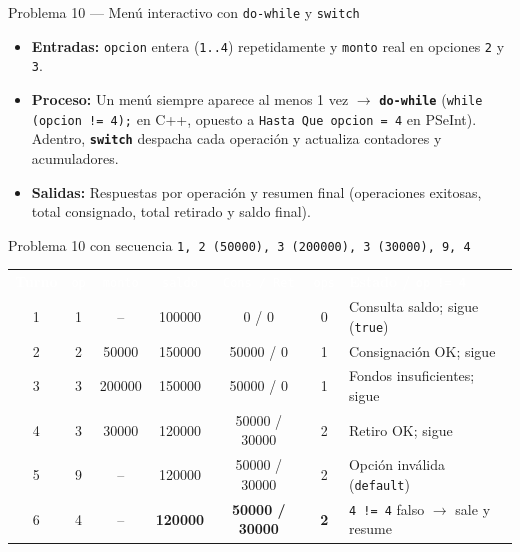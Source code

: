 \documentclass[11pt,letterpaper]{article}
\begin{document}
\begin{analisis}{Problema 10 --- Menú interactivo con \texttt{do-while} y \texttt{switch}}
\begin{itemize}
  \item \textbf{Entradas:} \texttt{opcion} entera (\texttt{1..4}) repetidamente y \texttt{monto} real en opciones \texttt{2} y \texttt{3}.
  \item \textbf{Proceso:} Un menú siempre aparece al menos 1 vez $\rightarrow$ \textbf{\texttt{do-while}} (\texttt{while (opcion != 4);} en C++, opuesto a \texttt{Hasta Que opcion = 4} en PSeInt). Adentro, \textbf{\texttt{switch}} despacha cada operación y actualiza contadores y acumuladores.
  \item \textbf{Salidas:} Respuestas por operación y resumen final (operaciones exitosas, total consignado, total retirado y saldo final).
\end{itemize}
\end{analisis}






\begin{pruebaescritorio}{Problema 10 con secuencia \texttt{1, 2 (50000), 3 (200000), 3 (30000), 9, 4}}
\begin{center}
\footnotesize
\setlength{\tabcolsep}{4pt}
\renewcommand{\arraystretch}{1.15}
\begin{tabularx}{\linewidth}{c c c c c c X}
\rowcolor{AzulMarino}
\textcolor{white}{\textbf{Turno}} & \textcolor{white}{\texttt{op}} & \textcolor{white}{\texttt{monto}} & \textcolor{white}{\texttt{saldo}} & \textcolor{white}{\texttt{Cons / Ret}} & \textcolor{white}{\texttt{ops}} & \textcolor{white}{\textbf{Estado / \texttt{op != 4}}} \\
1 & 1 & -- & 100000 & 0 / 0 & 0 & Consulta saldo; sigue (\texttt{true}) \\
2 & 2 & 50000 & 150000 & 50000 / 0 & 1 & Consignación OK; sigue \\
3 & 3 & 200000 & 150000 & 50000 / 0 & 1 & Fondos insuficientes; sigue \\
4 & 3 & 30000 & 120000 & 50000 / 30000 & 2 & Retiro OK; sigue \\
5 & 9 & -- & 120000 & 50000 / 30000 & 2 & Opción inválida (\texttt{default}) \\
6 & 4 & -- & \textbf{120000} & \textbf{50000 / 30000} & \textbf{2} & \texttt{4 != 4} falso $\rightarrow$ sale y resume \\
\bottomrule
\end{tabularx}
\end{center}
\end{pruebaescritorio}
\end{document}
